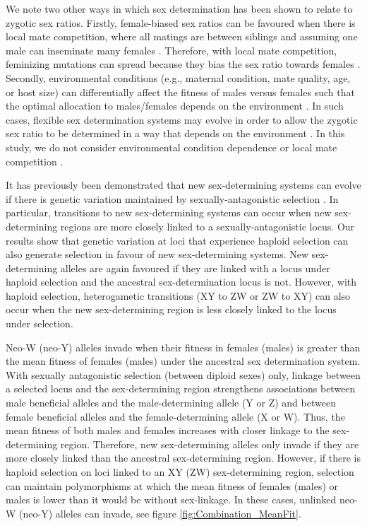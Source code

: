 \documentclass[12pt]{article}
\begin{document}
We note two other ways in which sex determination has been shown to relate to zygotic sex ratios.
Firstly, female-biased sex ratios can be favoured when there is local mate competition, where all matings are between siblings and assuming one male can inseminate many females \citep{Hamilton:1967ts}. 
Therefore, with local mate competition, feminizing mutations can spread because they bias the sex ratio towards females \citep{Wilson:1981vm,Vuillleumier:2007bh}. 
Secondly, environmental conditions (e.g., maternal condition, mate quality, age, or host size) can differentially affect the fitness of males versus females such that the optimal allocation to males/females depends on the environment \citep{Trivers:1973wb,Charnov:1977tx,Charnov:1982wg}. 
In such cases, flexible sex determination systems may evolve in order to allow the zygotic sex ratio to be determined in a way that depends on the environment \citep{Charnov:1977tx,Werren:1984tl,Pen:2010kk}. 
In this study, we do not consider environmental condition dependence or local mate competition \citep[reviewed in][]{Charnov:1982wg,Bull:1983vi,West:2009we}. 

It has previously been demonstrated that new sex-determining systems can evolve if there is genetic variation maintained by sexually-antagonistic selection \citep{vanDoorn:2007eu,vanDoorn:2010hu}. 
In particular, transitions to new sex-determining systems can occur when new sex-determining regions are more closely linked to a sexually-antagonistic locus.
Our results show that genetic variation at loci that experience haploid selection can also generate selection in favour of new sex-determining systems. 
New sex-determining alleles are again favoured if they are linked with a locus under haploid selection and the ancestral sex-determination locus is not.
However, with haploid selection, heterogametic transitions (XY to ZW or ZW to XY) can also occur when the new sex-determining region is less closely linked to the locus under selection. 

Neo-W (neo-Y) alleles invade when their fitness in females (males) is greater than the mean fitness of females (males) under the ancestral sex determination system.
With sexually antagonistic selection (between diploid sexes) only, linkage between a selected locus and the sex-determining region strengthens associations between male beneficial alleles and the male-determining allele (Y or Z) and between female beneficial alleles and the female-determining allele (X or W). 
Thus, the mean fitness of both males and females increases with closer linkage to the sex-determining region. 
Therefore, new sex-determining alleles only invade if they are more closely linked than the ancestral sex-determining region. 
However, if there is haploid selection on loci linked to an XY (ZW) sex-determining region, selection can maintain polymorphisms at which the mean fitness of females (males) or males is lower than it would be without sex-linkage. 
In these cases, unlinked neo-W (neo-Y) alleles can invade, see figure \ref{fig:Combination_MeanFit}. 
\end{document}
